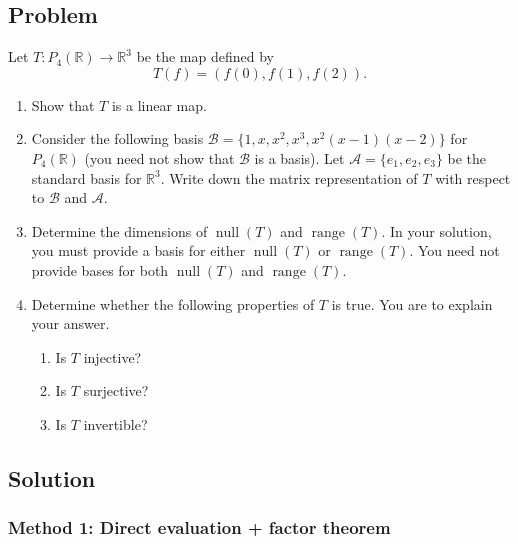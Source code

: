 \documentclass[12pt]{article}
\begin{document}
\subsection{Problem}
Let $T:P_4(\mathbb{R})\to \mathbb{R}^3$ be the map defined by
\[
T(f)=(f(0),f(1),f(2)).
\]

\begin{enumerate}[label=(\alph*)]
\item Show that $T$ is a linear map.
\item Consider the following basis $\mathcal{B}=\{1,x,x^2,x^3,x^2(x-1)(x-2)\}$ for $P_4(\mathbb{R})$ (you need not show that $\mathcal{B}$ is a basis). Let $\mathcal{A}=\{e_1,e_2,e_3\}$ be the standard basis for $\mathbb{R}^3$. Write down the matrix representation of $T$ with respect to $\mathcal{B}$ and $\mathcal{A}$.
\item Determine the dimensions of $\operatorname{null}(T)$ and $\operatorname{range}(T)$. In your solution, you must provide a basis for either $\operatorname{null}(T)$ or $\operatorname{range}(T)$. You need not provide bases for both $\operatorname{null}(T)$ and $\operatorname{range}(T)$.
\item Determine whether the following properties of $T$ is true. You are to explain your answer.
  \begin{enumerate}[label=(\roman*)]
  \item Is $T$ injective?
  \item Is $T$ surjective?
  \item Is $T$ invertible?
  \end{enumerate}
\end{enumerate}

\vspace{3cm}
\subsection{Solution}

\subsubsection{Method 1: Direct evaluation + factor theorem}
\end{document}
